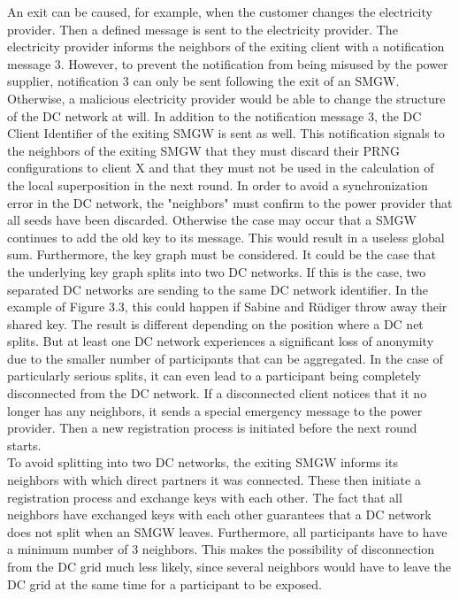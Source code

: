 An exit can be caused, for example, when the customer changes the electricity provider. Then a defined message is sent to the electricity provider. The electricity provider informs the neighbors of the exiting client with a notification message 3. However, to prevent the notification from being misused by the power supplier, notification 3 can only be sent following the exit of an SMGW. Otherwise, a malicious electricity provider would be able to change the structure of the DC network at will. In addition to the notification message 3, the DC Client Identifier of the exiting SMGW is sent as well. This notification signals to the neighbors of the exiting SMGW that they must discard their PRNG configurations to client X and that they must not be used in the calculation of the local superposition in the next round. In order to avoid a synchronization error in the DC network, the "neighbors" must confirm to the power provider that all seeds have been discarded. Otherwise the case may occur that a SMGW continues to add the old key to its message. This would result in a useless global sum. Furthermore, the key graph must be considered. It could be the case that the underlying key graph splits into two DC networks. If this is the case, two separated DC networks are sending to the same DC network identifier. In the example of Figure 3.3, this could happen if Sabine and Rüdiger throw away their shared key. The result is different depending on the position where a DC net splits. But at least one DC network experiences a significant loss of anonymity due to the smaller number of participants that can be aggregated. In the case of particularly serious splits, it can even lead to a participant being completely disconnected from the DC network. If a disconnected client notices that it no longer has any neighbors, it sends a special emergency message to the power provider. Then a new registration process is initiated before the next round starts.\\ To avoid splitting into two DC networks, the exiting SMGW informs its neighbors with which direct partners it was connected. These then initiate a registration process and exchange keys with each other. The fact that all neighbors have exchanged keys with each other guarantees that a DC network does not split when an SMGW leaves. Furthermore, all participants have to have a minimum number of 3 neighbors. This makes the possibility of disconnection from the DC grid much less likely, since several neighbors would have to leave the DC grid at the same time for a participant to be exposed.\\
